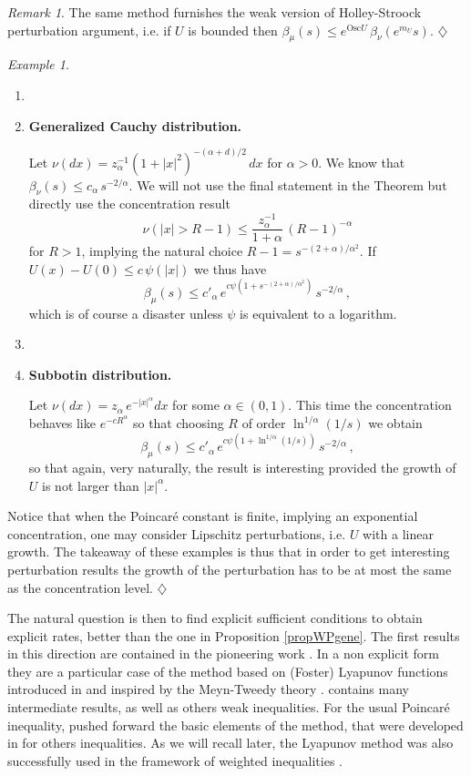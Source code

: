 \documentclass[11pt,reqno]{amsart}
\numberwithin{equation}{section}
\theoremstyle{definition}
\theoremstyle{remark}
\newtheorem{remark}[theorem]{Remark}
\newtheorem{example}[theorem]{Example}
\def \Osc {\textrm{Osc}}
\begin{document}
\begin{remark}\label{remWPboundperturb}
The same method furnishes the weak version of Holley-Stroock perturbation argument, i.e. if $U$ is bounded then $\beta_\mu(s) \leq e^{\Osc U} \, \beta_\nu(e^{m_U} s)$.
\hfill $\diamondsuit$
\end{remark}
\begin{example}\label{exampweak2}
\begin{enumerate}
\item[]
\item[(1)] \textbf{Generalized Cauchy distribution.} 

Let $\nu(dx)= z_\alpha^{-1} (1+|x|^2)^{- (\alpha+d)/2} \, dx$ for $\alpha>0$. We know that $\beta_\nu(s) \leq c_\alpha \, s^{-2/\alpha}$. We will not use the final statement in the Theorem but directly use the concentration result $$\nu(|x|>R-1) \leq \frac{z_\alpha^{-1}}{1+\alpha} \, (R-1)^{- \alpha}$$ for $R>1$, implying the natural choice  $R-1=s^{- (2+\alpha)/\alpha^2}$. If $U(x)-U(0) \leq c \, \psi(|x|)$ we thus have 
$$\beta_\mu(s) \leq c'_\alpha \, e^{c \psi(1+s^{-(2+\alpha)/\alpha^2})} \, s^{-2/\alpha} \, ,$$ which is  of course a disaster unless $\psi$ is equivalent to a logarithm. 
\item[]
\item[(2)] \textbf{Subbotin distribution.} 

Let $\nu(dx) = z_{\alpha} \, e^{-|x|^\alpha} dx$ for some $\alpha \in (0,1)$. This time the concentration behaves like $e^{-cR^\alpha}$ so that choosing $R$ of order $\ln^{1/\alpha}(1/s)$ we obtain  $$\beta_\mu(s) \leq c'_\alpha \, e^{c \psi(1+\ln^{1/\alpha}(1/s))} \, s^{-2/\alpha} \, ,$$ so that again, very naturally, the result is interesting provided the growth of $U$ is not larger than $|x|^\alpha$.
\end{enumerate}
Notice that when the Poincar\'e constant is finite, implying an exponential concentration, one may consider Lipschitz perturbations, i.e. $U$ with a linear growth. The takeaway of these examples is thus that in order to get interesting perturbation results the growth of the perturbation has to be at most the same as the concentration level. \hfill $\diamondsuit$
\end{example}


The natural question is then to find explicit sufficient conditions to obtain explicit rates, better than the one in Proposition \ref{propWPgene}. The first results in this direction are contained in the pioneering work \cite{RW}. In a non explicit form they are a particular case of the method based on (Foster) Lyapunov functions introduced in \cite{BCG} and inspired by the Meyn-Tweedy theory \cite{DMT}.  \cite{BCG} contains many intermediate results, as well as others weak inequalities. For the usual Poincar\'e inequality, \cite{BBCG} pushed forward the basic elements of the method, that were developed in \cite{CGopt,CGhit,CGWW,CGZ}  for others inequalities. As we will recall later, the Lyapunov method was also successfully used in the framework of weighted inequalities \cite{CGGR}. 
\end{document}
